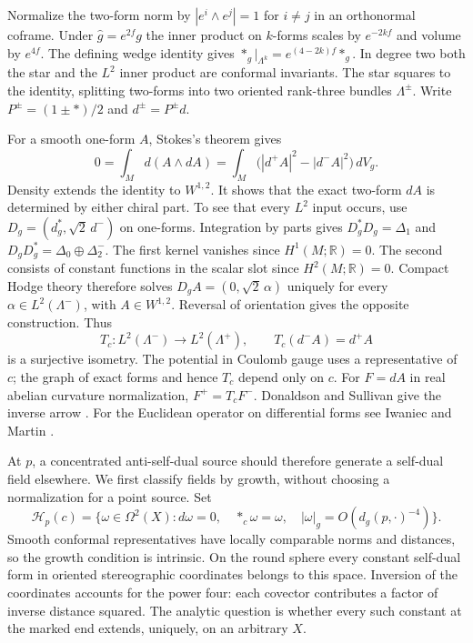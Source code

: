 \documentclass[11pt,letterpaper]{article}
\numberwithin{equation}{section}
\begin{document}
Normalize the two-form norm by \(|e^i\wedge e^j|=1\) for \(i\ne j\)
in an orthonormal coframe. Under \(\widehat g=e^{2f}g\) the inner
product on \(k\)-forms scales by \(e^{-2kf}\) and volume by \(e^{4f}\).
The defining wedge identity gives
\(
*_{\widehat g}|_{\Lambda^k}=e^{(4-2k)f}*_g.
\)
In degree two both the star and the \(L^2\) inner product are
conformal invariants. The star squares to the identity, splitting
two-forms into two oriented rank-three bundles \(\Lambda^\pm\).
Write \(P^\pm=(1\pm *)/2\) and \(d^\pm=P^\pm d\).

For a smooth one-form \(A\), Stokes's theorem gives
\[
   0=\int_M d(A\wedge dA)=
   \int_M\bigl(|d^+A|^2-|d^-A|^2\bigr)\,dV_g .
\]
Density extends the identity to \(W^{1,2}\). It shows that the exact
two-form \(dA\) is determined by either chiral part. To see that every
\(L^2\) input occurs, use \(D_g=(d_g^*,\sqrt2\,d^-)\) on one-forms.
Integration by parts gives \(D_g^*D_g=\Delta_1\) and
\(D_gD_g^*=\Delta_0\oplus\Delta_2^-\). The first kernel vanishes since
\(H^1(M;\mathbb R)=0\). The second consists of constant functions in
the scalar slot since \(H^2(M;\mathbb R)=0\).
Compact Hodge theory therefore solves
\(D_g A=(0,\sqrt2\,\alpha)\) uniquely for every
\(\alpha\in L^2(\Lambda^-)\), with \(A\in W^{1,2}\). Reversal of
orientation gives the opposite construction. Thus
\begin{equation}\label{eq:transfer}
 T_c:L^2(\Lambda^-)\longrightarrow L^2(\Lambda^+),\qquad
 T_c(d^-A)=d^+A
\end{equation}
is a surjective isometry. The potential in Coulomb gauge uses a
representative of \(c\); the graph of exact forms and hence \(T_c\)
depend only on \(c\). For \(F=dA\) in real abelian curvature
normalization, \(F^+=T_c F^-\). Donaldson and Sullivan give the
inverse arrow \cite[\S2(ii), (2.9)--(2.13)]{DonaldsonSullivan1989}.
For the Euclidean operator on differential forms see Iwaniec and
Martin \cite[\S8]{IwaniecMartin1993}.

At \(p\), a concentrated anti-self-dual source should therefore generate
a self-dual field elsewhere. We first classify fields by growth, without
choosing a normalization for a point source. Set
\begin{equation}\label{eq:pole-space}
 \mathcal H_p(c)=\bigl\{\omega\in\Omega^2(X):
   d\omega=0,\quad *_c\omega=\omega,\quad
   |\omega|_g=O(d_g(p,\cdot)^{-4})\bigr\}.
\end{equation}
Smooth conformal representatives have locally comparable norms and
distances, so the growth condition is intrinsic. On the round sphere
every constant self-dual form in oriented stereographic coordinates
belongs to this space. Inversion of the coordinates accounts for the
power four: each covector contributes a factor of inverse distance
squared. The analytic question is whether every such constant at the
marked end extends, uniquely, on an arbitrary \(X\).
\end{document}
